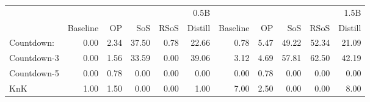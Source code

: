 \begin{tabular}{lrrrrrrrrrr}
\toprule
 & \multicolumn{5}{r}{0.5B} & \multicolumn{5}{r}{1.5B} \\
 & Baseline & OP & SoS & RSoS & Distill & Baseline & OP & SoS & RSoS & Distill \\
\midrule
Countdown: & 0.00 & 2.34 & 37.50 & 0.78 & 22.66 & 0.78 & 5.47 & 49.22 & 52.34 & 21.09 \\
Countdown-3 & 0.00 & 1.56 & 33.59 & 0.00 & 39.06 & 3.12 & 4.69 & 57.81 & 62.50 & 42.19 \\
Countdown-5 & 0.00 & 0.78 & 0.00 & 0.00 & 0.00 & 0.00 & 0.78 & 0.00 & 0.00 & 0.00 \\
KnK & 1.00 & 1.50 & 0.00 & 0.00 & 1.00 & 7.00 & 2.50 & 0.00 & 0.00 & 8.00 \\
\bottomrule
\end{tabular}
